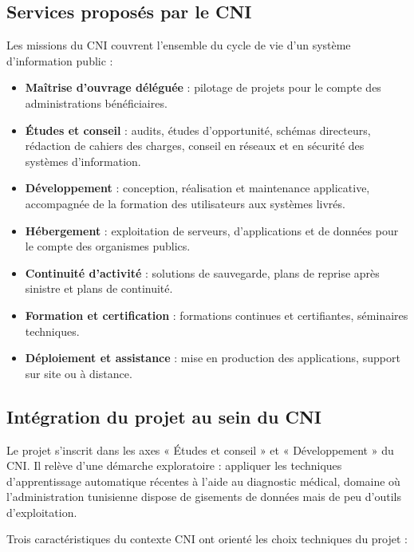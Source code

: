 \subsection{Services proposés par le CNI}

Les missions du CNI couvrent l'ensemble du cycle de vie d'un système d'information
public :

\begin{itemize}[itemsep=2pt,topsep=4pt]
  \item \textbf{Maîtrise d'ouvrage déléguée} : pilotage de projets pour le compte
        des administrations bénéficiaires.
  \item \textbf{Études et conseil} : audits, études d'opportunité, schémas
        directeurs, rédaction de cahiers des charges, conseil en réseaux et en sécurité
        des systèmes d'information.
  \item \textbf{Développement} : conception, réalisation et maintenance applicative,
        accompagnée de la formation des utilisateurs aux systèmes livrés.
  \item \textbf{Hébergement} : exploitation de serveurs, d'applications et de données
        pour le compte des organismes publics.
  \item \textbf{Continuité d'activité} : solutions de sauvegarde, plans de reprise
        après sinistre et plans de continuité.
  \item \textbf{Formation et certification} : formations continues et certifiantes,
        séminaires techniques.
  \item \textbf{Déploiement et assistance} : mise en production des applications,
        support sur site ou à distance.
\end{itemize}

\subsection{Intégration du projet au sein du CNI}

Le projet \hypnoria{} s'inscrit dans les axes « Études et conseil » et
« Développement » du CNI. Il relève d'une démarche exploratoire : appliquer les
techniques d'apprentissage automatique récentes à l'aide au diagnostic médical, domaine
où l'administration tunisienne dispose de gisements de données mais de peu d'outils
d'exploitation.

Trois caractéristiques du contexte CNI ont orienté les choix techniques du projet :

